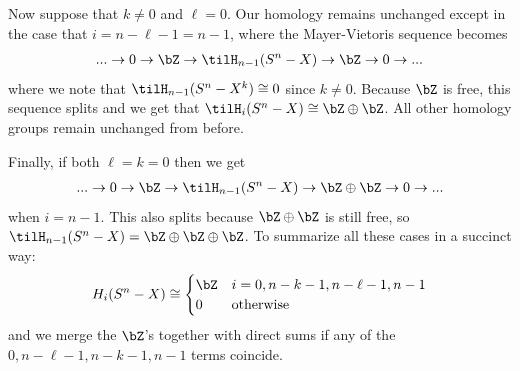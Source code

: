 \begin{homework}[e]
\begin{prf}
    \bigskip

    Now suppose that $k \neq 0$ and $\ell = 0$. Our homology remains unchanged except in the case that $i = n-\ell - 1 = n - 1$, where the Mayer-Vietoris sequence becomes
    \begin{align*}
      ...\to 0 \to \bZ \to \tilH_{n-1}(S^n - X) \to \bZ \to 0 \to ...
    \end{align*}
    where we note that $\tilH_{n-1}(S^n - X^k) \cong 0$ since $k \neq 0$. Because $\bZ$ is free, this sequence splits and we get that $\tilH_i(S^n - X) \cong \bZ \oplus \bZ$. All other homology groups remain unchanged from before.

    \bigskip

    Finally, if both $\ell = k = 0$ then we get
    \begin{align*}
      ...\to 0 \to \bZ \to \tilH_{n-1}(S^n - X) \to \bZ \oplus \bZ\to 0 \to ...
    \end{align*}
    when $i = n-1$. This also splits because $\bZ\oplus \bZ$ is still free, so $\tilH_{n-1}(S^n - X) = \bZ\oplus \bZ\oplus \bZ$. To summarize all these cases in a succinct way:
    \begin{align*}
      H_i(S^n - X) \cong
      \begin{cases}
        \bZ & i = 0, n-k - 1, n - \ell - 1, n-1 \\
        0 & \text{otherwise}
      \end{cases}
    \end{align*}
    and we merge the $\bZ$'s together with direct sums if any of the $0,n - \ell - 1, n - k - 1, n - 1$ terms coincide.

    \bigskip


\end{prf}
\end{homework}
